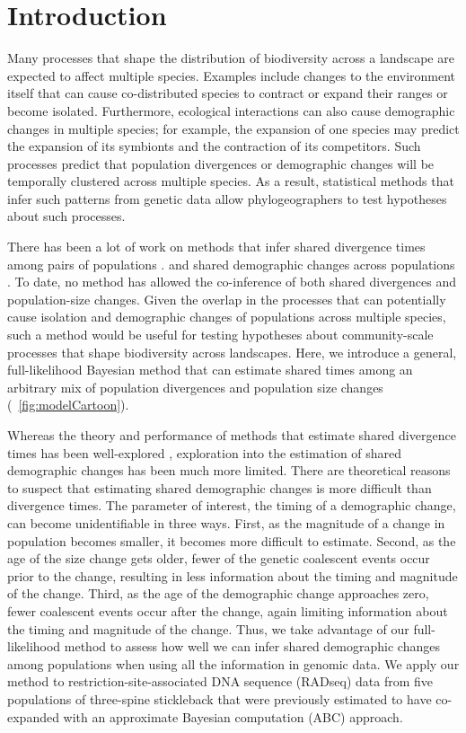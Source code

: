 \section{Introduction}

Many processes that shape the distribution of biodiversity across a landscape
are expected to affect multiple species.
Examples include changes to the environment itself that can cause
co-distributed species to contract or expand their ranges or become isolated.
Furthermore, ecological interactions can also cause demographic changes in
multiple species;
for example, the expansion of one species may predict the expansion of its
symbionts and the contraction of its competitors.
Such processes predict that population divergences or demographic changes will
be temporally clustered across multiple species.
As a result, statistical methods that infer such patterns from genetic data
allow phylogeographers to test hypotheses about such processes.

There has been a lot of work on methods that infer shared divergence times
among pairs of populations
\citep{Hickerson2006,Hickerson2007,Huang2011,Oaks2014dpp,Oaks2018ecoevolity}.
and shared demographic changes across populations
\citep{Chan2014,Xue2015,Burbrink2016,Xue2017,Gehara2017}.
To date, no method has allowed the co-inference of both shared divergences
and population-size changes.
Given the overlap in the processes that can potentially cause isolation and
demographic changes of populations across multiple species, such a method would
be useful for testing hypotheses about community-scale processes that shape
biodiversity across landscapes.
Here, we introduce a general, full-likelihood Bayesian method that can estimate
shared times among an arbitrary mix of population divergences and population
size changes (\fig{}~\ref{fig:modelCartoon}).

Whereas the theory and performance of methods that estimate shared divergence
times has been well-explored
\citep[e.g.,][]{Oaks2012,Hickerson2013,Oaks2014reply,Oaks2014dpp,Overcast2017,Oaks2018ecoevolity},
exploration into the estimation of shared demographic changes has been much
more limited.
There are theoretical reasons to suspect that estimating shared demographic
changes is more difficult than divergence times.
The parameter of interest, the timing of a demographic change, can become
unidentifiable in three ways.
First, as the magnitude of a change in population becomes smaller,
it becomes more difficult to estimate.
Second, as the age of the size change gets older, fewer of the genetic
coalescent events occur prior to the change, resulting in less information
about the timing and magnitude of the change.
Third, as the age of the demographic change approaches zero, fewer coalescent
events occur after the change, again limiting information about the timing and
magnitude of the change.
Thus, we take advantage of our full-likelihood method to assess how well we can
infer shared demographic changes among populations when using all the
information in genomic data.
We apply our method to restriction-site-associated DNA sequence (RADseq) data
from five populations of three-spine stickleback that were previously estimated
to have co-expanded with an approximate Bayesian computation (ABC) approach.

